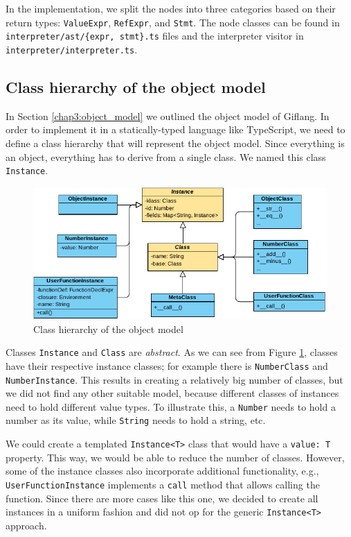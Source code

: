 In the implementation, we split the nodes into three categories based on their return types: \texttt{ValueExpr}, \texttt{RefExpr}, and \texttt{Stmt}.
The node classes can be found in \texttt{interpreter/ast/\{expr, stmt\}.ts} files and the interpreter visitor in \texttt{interpreter/interpreter.ts}. 

\subsection{Class hierarchy of the object model}
In Section \ref{chap3:object_model} we outlined the object model of Giflang. In order to implement it in a statically-typed language like TypeScript, we
need to define a class hierarchy that will represent the object model. Since everything is an object, everything has to derive from a single class. We named
this class \texttt{Instance}.
\begin{figure}[!hbt]
	\includegraphics[width=1\textwidth]{../img/class_hierarchy}
    \caption{Class hierarchy of the object model}
	\label{fig:chap4:class_hierarchy}
\end{figure}

Classes \texttt{Instance} and \texttt{Class} are \emph{abstract}. As we can see from Figure \ref{fig:chap4:class_hierarchy}, classes have their
respective instance classes; for example there is \texttt{NumberClass} and \texttt{NumberInstance}. This results in creating a relatively big number
of classes, but we did not find any other suitable model, because different classes of instances need to hold different value types. To illustrate this,
a \texttt{Number} needs to hold a number as its value, while \texttt{String} needs to hold a string, etc.

We could create a templated \texttt{Instance<T>} class that would have a \texttt{value: T} property. This way, we would be able to reduce the number of
classes. However, some of the instance classes also incorporate additional functionality, e.g., \texttt{UserFunctionInstance} implements a \texttt{call} method
that allows calling the function. Since there are more cases like this one, we decided to create all instances in a uniform fashion and did not op for the
generic \texttt{Instance<T>} approach.

